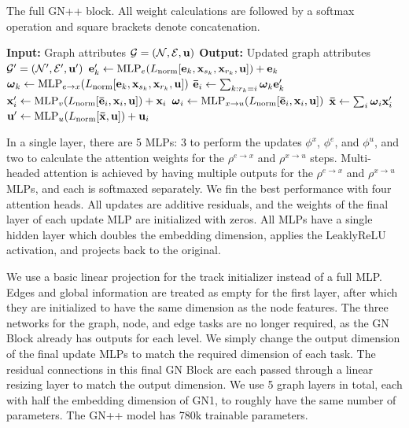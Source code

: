 \begin{algorithm}[h!]
    \caption{The full GN++ block. All weight calculations are followed by a softmax operation and square brackets denote concatenation.}
    \label{alg:gnpp}
    \begin{algorithmic}[1]
        \State \textbf{Input:} Graph attributes $\mathcal{G} = (\mathcal{N}, \mathcal{E}, \mathbf{u})$
        \State \textbf{Output:} Updated graph attributes $\mathcal{G}' = (\mathcal{N}', \mathcal{E}', \mathbf{u}')$
            \State $\mathbf{e}_k' \gets \text{MLP}_e(L_{\text{norm}}[\mathbf{e}_k, \mathbf{x}_{s_k}, \mathbf{x}_{r_k}, \mathbf{u}]) + \mathbf{e}_k$ 
            \State $\boldsymbol{\omega}_k \gets \text{MLP}_{e \to x}(L_{\text{norm}}[\mathbf{e}_k, \mathbf{x}_{s_k}, \mathbf{x}_{r_k}, \mathbf{u}])$ 
        \EndFor
            \State $\mathbf{\bar{\mathbf{e}}}_i \gets \sum_{k: r_k = i} \boldsymbol{\omega}_k \mathbf{e}_k'$ 
            \State $\mathbf{x}_i' \gets \text{MLP}_v(L_{\text{norm}}[\mathbf{\bar{\mathbf{e}}}_i, \mathbf{x}_i, \mathbf{u}]) + \mathbf{x}_i$ 
            \State $\boldsymbol{\omega}_i \gets \text{MLP}_{x \to u}(L_{\text{norm}}[\mathbf{\bar{\mathbf{e}}}_i, \mathbf{x}_i, \mathbf{u}])$ 
        \EndFor
        \State $\mathbf{\bar{x}} \gets \sum_{i} \boldsymbol{\omega}_i \mathbf{x}_i'$ 
        \State $\mathbf{u}' \gets \text{MLP}_u(L_{\text{norm}}[\mathbf{\bar{x}}, \mathbf{u}]) + \mathbf{u}_i$ 
    \end{algorithmic}
\end{algorithm}

In a single layer, there are 5 MLPs: 3 to perform the updates $\phi^x$, $\phi^e$, and $\phi^u$, and two to calculate the attention weights for the $\rho^{e \to x}$ and $\rho^{x \to u}$ steps.
Multi-headed attention is achieved by having multiple outputs for the $\rho^{e \to x}$ and $\rho^{x \to u}$ MLPs, and each is softmaxed separately.
We fin the best performance with four attention heads.
All updates are additive residuals, and the weights of the final layer of each update MLP are initialized with zeros.
All MLPs have a single hidden layer which doubles the embedding dimension, applies the LeaklyReLU activation, and projects back to the original.

We use a basic linear projection for the track initializer instead of a full MLP\@.
Edges and global information are treated as empty for the first layer, after which they are initialized to have the same dimension as the node features.
The three networks for the graph, node, and edge tasks are no longer required, as the GN Block already has outputs for each level.
We simply change the output dimension of the final update MLPs to match the required dimension of each task.
The residual connections in this final GN Block are each passed through a linear resizing layer to match the output dimension.
We use 5 graph layers in total, each with half the embedding dimension of GN1, to roughly have the same number of parameters.
The GN++ model has 780k trainable parameters.


